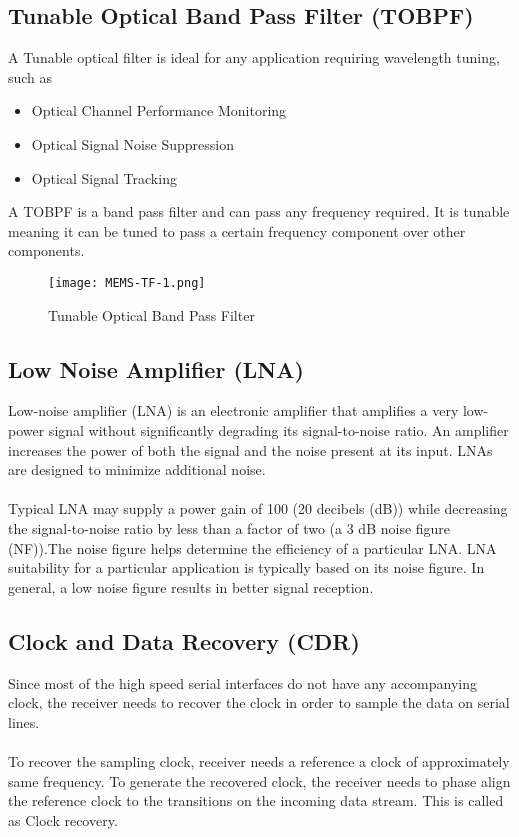 \documentclass[hidelinks, 12pt]{report}
\begin{document}
\subsection{Tunable Optical Band Pass Filter (TOBPF)}
A Tunable optical filter is ideal for any application requiring wavelength tuning, such as
\begin{itemize}
    \item Optical Channel Performance Monitoring
    \item Optical Signal Noise Suppression
    \item Optical Signal Tracking 
\end{itemize}
A TOBPF is a band pass filter and can pass any frequency required. It is tunable meaning it can be tuned to pass a certain frequency component over other components.
\begin{figure}[H]
\centering
\texttt{[image: MEMS-TF-1.png]}
\caption[Tunable Optical Band Pass Filter ]{Tunable Optical Band Pass Filter }
\label{Tunable Optical Band Pass Filter }
\end{figure}
\subsection{Low Noise Amplifier (LNA)}
\justify
 Low-noise amplifier (LNA) is an electronic amplifier that amplifies a very low-power signal without significantly degrading its signal-to-noise ratio. An amplifier increases the power of both the signal and the noise present at its input. LNAs are designed to minimize additional noise. \\
 \\ Typical LNA may supply a power gain of 100 (20 decibels (dB)) while decreasing the signal-to-noise ratio by less than a factor of two (a 3 dB noise figure (NF)).The noise figure helps determine the efficiency of a particular LNA. LNA suitability for a particular application is typically based on its noise figure. In general, a low noise figure results in better signal reception. 
 \subsection{Clock and Data Recovery (CDR)}
 \justify
 Since most of the high speed serial interfaces do not have any accompanying clock, the receiver needs to recover the clock in order to sample the data on serial lines.\\
\\
To recover the sampling clock, receiver needs a reference a clock of approximately same frequency. To generate the recovered clock, the receiver needs to phase align the reference clock to the transitions on the incoming data stream. This is called as Clock recovery.\\
\end{document}
